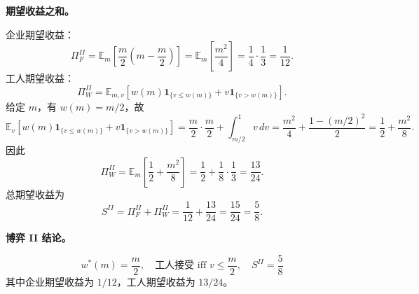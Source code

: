 \textbf{期望收益之和。}

企业期望收益：
\[
	\Pi_F^{II}=\mathbb{E}_m\left[\frac{m}{2}\left(m-\frac{m}{2}\right)\right]
	=\mathbb{E}_m\left[\frac{m^2}{4}\right]
	=\frac{1}{4}\cdot\frac{1}{3}
	=\frac{1}{12}.
\]\indent
工人期望收益：
\[
	\Pi_W^{II}=\mathbb{E}_{m,v}\left[w(m)\mathbf{1}_{\{v\le w(m)\}}
	+v\mathbf{1}_{\{v>w(m)\}}\right].
\]\indent
给定 $m$，有 $w(m)=m/2$，故
\[
	\mathbb{E}_v\left[w(m)\mathbf{1}_{\{v\le w(m)\}}+v\mathbf{1}_{\{v>w(m)\}}\right]
	=\frac{m}{2}\cdot\frac{m}{2}+\int_{m/2}^{1}v\,dv
	=\frac{m^2}{4}+\frac{1-(m/2)^2}{2}
	=\frac{1}{2}+\frac{m^2}{8}.
\]\indent
因此
\[
	\Pi_W^{II}=\mathbb{E}_m\left[\frac12+\frac{m^2}{8}\right]
	=\frac12+\frac{1}{8}\cdot\frac13
	=\frac{13}{24}.
\]\indent
总期望收益为
\[
	S^{II}=\Pi_F^{II}+\Pi_W^{II}=\frac{1}{12}+\frac{13}{24}=\frac{15}{24}=\frac58.
\]

\textbf{博弈 II 结论。}

\[
	\boxed{
	w^*(m)=\frac{m}{2},\quad
	\text{工人接受 iff }v\le\frac{m}{2},\quad
	S^{II}=\frac58
	}
\]\indent
其中企业期望收益为 $1/12$，工人期望收益为 $13/24$。

